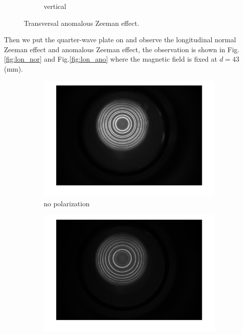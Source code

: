 \documentclass[a4paper,12pt]{article}
\begin{document}
\begin{figure}[H]
\begin{subfigure}[b]{0.3\textwidth}
            \caption{vertical}
        \end{subfigure}
        \caption{Transversal anomalous Zeeman effect.}
        \label{fig:tra_ano}
    \end{figure}
    
    \par Then we put the quarter-wave plate on and observe the longitudinal normal Zeeman effect and anomalous Zeeman effect, the observation is shown in Fig.\ref{fig:lon_nor} and Fig.\ref{fig:lon_ano} where the magnetic field is fixed at $d=43 $ (mm).
    
    \begin{figure}[H]
        \centering
        \begin{subfigure}[b]{0.3\textwidth}
            \includegraphics[width=1.2\textwidth]{lon_nor_none.png}
            \caption{no polarization}
        \end{subfigure}
        \space
        \begin{subfigure}[b]{0.3\textwidth}
            \includegraphics[width=1.2\textwidth]{lon_nor_45.png}

\end{subfigure}
\end{figure}
\end{document}
